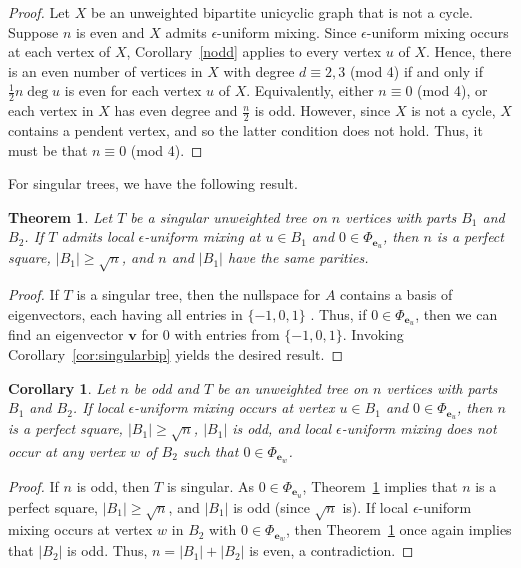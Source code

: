 \documentclass[11pt]{article}
\newtheorem{theorem}{Theorem}
\newtheorem{corollary}{Corollary}
\newcommand{\be}{\mathbf e}
\newcommand{\bv}{\mathbf v}
\newcommand{\supp}{{\Phi}}
\begin{document}
\begin{proof}
Let $X$ be an unweighted bipartite unicyclic graph that is not a cycle. Suppose $n$ is even and $X$ admits $\epsilon$-uniform mixing. Since $\epsilon$-uniform mixing occurs at each vertex of $X$, Corollary~\ref{nodd} applies to every vertex $u$ of $X$. Hence, there is an even number of vertices in $X$ with degree $d\equiv 2,3$ (mod 4) if and only if $\frac{1}{2}n\operatorname{deg}u$ is even for each vertex $u$ of $X$. Equivalently, either $n\equiv 0$ (mod 4), or each vertex in $X$ has even degree and $\frac{n}{2}$ is odd. However, since $X$ is not a cycle, $X$ contains a pendent vertex, and so the latter condition does not hold. Thus, it must be that $n\equiv 0$ (mod 4).
\end{proof}

For singular trees, we have the following result.

\begin{theorem}
\label{thm:1tree}
Let $T$ be a singular unweighted tree on $n$ vertices with parts $B_1$ and $B_2$. If $T$ admits local $\epsilon$-uniform mixing at $u\in B_1$ and $0\in\supp_{\be_u}$, then $n$ is a perfect square, $|B_1|\geq \sqrt{n}$, and $n$ and $|B_1|$ have the same parities.
\end{theorem}

\begin{proof}
If $T$ is a singular tree, then the nullspace for $A$ contains a basis of eigenvectors, each having all entries in $\{-1,0,1\}$ \cite{akbari20061}. Thus, if $0\in\supp_{\be_u}$, then we can find an eigenvector $\bv$ for 0 with entries from $\{-1,0,1\}$. Invoking  Corollary~\ref{cor:singularbip} yields the desired result.
\end{proof}

\begin{corollary}
\label{cor:singularbip1}
Let $n$ be odd and $T$ be an unweighted tree on $n$ vertices with parts $B_1$ and $B_2$. If local $\epsilon$-uniform mixing occurs at vertex $u\in B_1$ and $0\in\supp_{\be_u}$, then $n$ is a perfect square, $|B_1|\geq \sqrt{n}$, $|B_1|$ is odd, and local $\epsilon$-uniform mixing does not occur at any vertex $w$ of $B_2$ such that $0\in\supp_{\be_w}$.
\end{corollary}

\begin{proof}
If $n$ is odd, then $T$ is singular. As $0\in\supp_{\be_u}$, Theorem~\ref{thm:1tree} implies that $n$ is a perfect square, $|B_1|\geq \sqrt{n}$, and $|B_1|$ is odd (since $\sqrt{n}$ is). If local $\epsilon$-uniform mixing occurs at vertex $w$ in $B_2$ with $0\in\supp_{\be_w}$, then Theorem~\ref{thm:1tree} once again implies that $|B_2|$ is odd. Thus, $n=|B_1|+|B_2|$ is even, a contradiction.
\end{proof}
\end{document}
